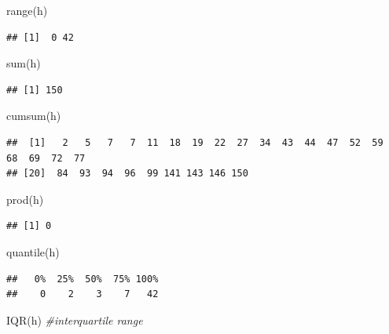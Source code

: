\documentclass[
]{book}
\newenvironment{Shaded}{\begin{snugshade}}{\end{snugshade}}
\newcommand{\CommentTok}[1]{\textcolor[rgb]{0.56,0.35,0.01}{\textit{#1}}}
\newcommand{\FunctionTok}[1]{\textcolor[rgb]{0.00,0.00,0.00}{#1}}
\newcommand{\NormalTok}[1]{#1}
\theoremstyle{definition}
\theoremstyle{definition}
\theoremstyle{definition}
\theoremstyle{definition}
\theoremstyle{remark}
\begin{document}
\begin{Shaded}
\begin{Highlighting}[]
\FunctionTok{range}\NormalTok{(h)}
\end{Highlighting}
\end{Shaded}

\begin{verbatim}
## [1]  0 42
\end{verbatim}

\begin{Shaded}
\begin{Highlighting}[]
\FunctionTok{sum}\NormalTok{(h)}
\end{Highlighting}
\end{Shaded}

\begin{verbatim}
## [1] 150
\end{verbatim}

\begin{Shaded}
\begin{Highlighting}[]
\FunctionTok{cumsum}\NormalTok{(h)}
\end{Highlighting}
\end{Shaded}

\begin{verbatim}
##  [1]   2   5   7   7  11  18  19  22  27  34  43  44  47  52  59  68  69  72  77
## [20]  84  93  94  96  99 141 143 146 150
\end{verbatim}

\begin{Shaded}
\begin{Highlighting}[]
\FunctionTok{prod}\NormalTok{(h)}
\end{Highlighting}
\end{Shaded}

\begin{verbatim}
## [1] 0
\end{verbatim}

\begin{Shaded}
\begin{Highlighting}[]
\FunctionTok{quantile}\NormalTok{(h)}
\end{Highlighting}
\end{Shaded}

\begin{verbatim}
##   0%  25%  50%  75% 100% 
##    0    2    3    7   42
\end{verbatim}

\begin{Shaded}
\begin{Highlighting}[]
\FunctionTok{IQR}\NormalTok{(h) }\CommentTok{\#interquartile range}
\end{Highlighting}
\end{Shaded}
\end{document}
